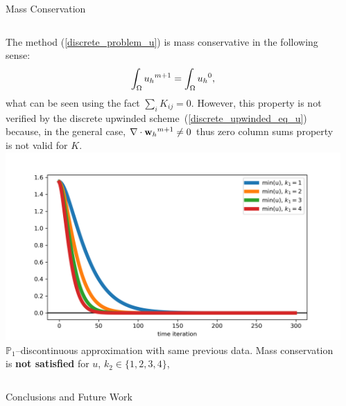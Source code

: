\documentclass[final]{beamer}
\newlength{\sepmargin}
\newlength{\onecolwid}
\begin{document}
\begin{frame}[t]
\begin{columns}[t]
\begin{column}{\onecolwid}
      \vspace{0.2cm}

      \begin{block}{Mass Conservation}
        \begin{columns}
          The method (\ref{discrete_problem_u}) is mass conservative in the following sense:
          \begin{equation*}
            \int_\Omega {{u_{h}}^{m+1}} = \int_\Omega {u_{h}}^0,
          \end{equation*}
          what can be seen using the fact $\sum_i K_{ij}=0$. However, this
          property is \alert{not verified} by the discrete upwinded
          scheme~(\ref{discrete_upwinded_eq_u}) because, in the general
          case, $\nabla\cdot{}{{\mathbf{w}_{h}}^{m+1}}\neq 0$ thus zero column sums property is
          not valid for $K$.
          \includegraphics[width=\textwidth]{positive_scheme_mass_k1=1,2,3,4.png}
          \small
            \alert{$\mathbb{P}_1$--discontinuous} approximation with
            same previous data. Mass conservation is \alert{\textbf{not satisfied}} for $u$,
              $k_2\in\{1,2,3,4\}$,
        \end{columns}
      \end{block}

      \begin{block}{Conclusions and Future Work}
      \end{block}

    \end{column}

    \begin{column}{\sepmargin} \end{column}
  \end{columns}



\end{frame}
\end{document}
